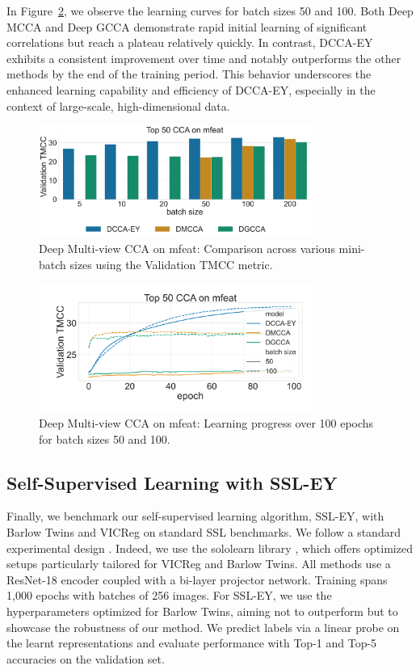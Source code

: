 In Figure~\ref{fig:dmcca_lr}, we observe the learning curves for batch sizes 50 and 100. Both Deep MCCA and Deep GCCA demonstrate rapid initial learning of significant correlations but reach a plateau relatively quickly. In contrast, DCCA-EY exhibits a consistent improvement over time and notably outperforms the other methods by the end of the training period. This behavior underscores the enhanced learning capability and efficiency of DCCA-EY, especially in the context of large-scale, high-dimensional data.

\begin{figure}
    \centering
    \includegraphics[width=0.8\textwidth]{figures/DMCCA/mfeat_models_different_batch_sizes}
    \caption{Deep Multi-view CCA on mfeat: Comparison across various mini-batch sizes using the Validation TMCC metric.}\label{fig:dmcca_corr}
\end{figure}

\begin{figure}
    \centering
    \includegraphics[width=0.8\textwidth]{figures/DMCCA/mfeat_allbatchsizes_pcc}
    \caption{Deep Multi-view CCA on mfeat: Learning progress over 100 epochs for batch sizes 50 and 100.}\label{fig:dmcca_lr}
\end{figure}

\subsection{Self-Supervised Learning with SSL-EY}
Finally, we benchmark our self-supervised learning algorithm, SSL-EY, with Barlow Twins and VICReg on standard SSL benchmarks.
We follow a standard experimental design \citep{tong2023emp}.
Indeed, we use the sololearn library \citep{da2022solo}, which offers optimized setups particularly tailored for VICReg and Barlow Twins.
All methods use a ResNet-18 encoder coupled with a bi-layer projector network.
Training spans 1,000 epochs with batches of 256 images.
For SSL-EY, we use the hyperparameters optimized for Barlow Twins, aiming not to outperform but to showcase the robustness of our method.
We predict labels via a linear probe on the learnt representations and evaluate performance with Top-1 and Top-5 accuracies on the validation set.

